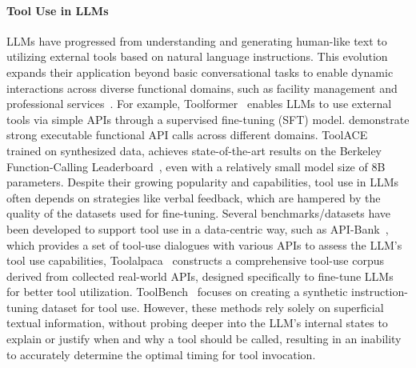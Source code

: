 \paragraph{Tool Use in LLMs}
LLMs have progressed from understanding and generating human-like text to utilizing external tools based on natural language instructions. This evolution expands their application beyond basic conversational tasks to enable dynamic interactions across diverse functional domains, such as facility management and professional services~\citep{patil2023gorilla, liu2023bolaa,qin2023toolllm,chen2023agentverse}. For example, Toolformer~\citep{schick2024toolformer} enables LLMs to use external tools via simple APIs through a supervised fine-tuning (SFT) model. \cite{liuapigen} demonstrate strong executable functional API calls across different domains. ToolACE~\citep{liu2024toolace} trained on synthesized data, achieves state-of-the-art results on the Berkeley Function-Calling Leaderboard~\citep{berkeley-function-calling-leaderboard}, even with a relatively small model size of 8B parameters. Despite their growing popularity and capabilities, tool use in LLMs often depends on strategies like verbal feedback, which are hampered by the quality of the datasets used for fine-tuning. Several benchmarks/datasets have been developed to support tool use in a data-centric way, such as API-Bank~\citep{li2023comprehensive}, which provides a set of tool-use dialogues with various APIs to assess the LLM's tool use capabilities, Toolalpaca~\citep{tang2023toolalpaca} constructs a comprehensive tool-use corpus derived from collected real-world APIs, designed specifically to fine-tune LLMs for better tool utilization. ToolBench~\citep{qin2023toolllm} focuses on creating a synthetic instruction-tuning dataset for tool use. However, these methods rely solely on superficial textual information, without probing deeper into the LLM’s internal states to explain or justify when and why a tool should be called, resulting in an inability to accurately determine the optimal timing for tool invocation.

